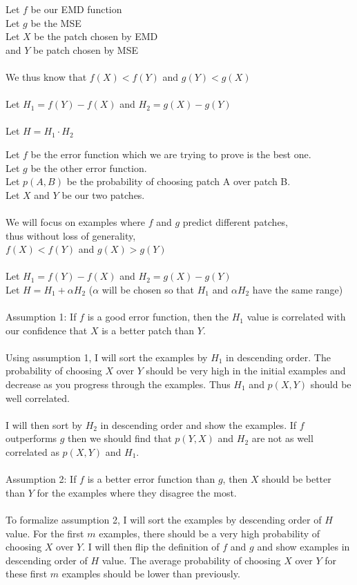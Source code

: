 \documentclass[12pt,psfig]{article}
\begin{document}
\setlength{\parskip}{1.2ex plus0.3ex minus 0.3ex}


\thispagestyle{empty} \pagestyle{myheadings} 

Let $f$ be our EMD function\\
Let $g$ be the MSE\\
Let $X$ be the patch chosen by EMD \\
and $Y$ be patch chosen by MSE\\
\\
We thus know that $f(X)<f(Y)$ and $g(Y)<g(X)$\\
\\
Let $H_1=f(Y)-f(X)$ and $H_2=g(X)-g(Y)$\\
\\
Let $H=H_1 \cdot H_2$

\newpage

Let $f$ be the error function which we are trying to prove is the best one.\\
Let $g$ be the other error function.\\
Let $p(A,B)$ be the probability of choosing patch A over patch B.\\
Let $X$ and $Y$ be our two patches.\\
\\
We will focus on examples where $f$ and $g$ predict different patches, \\
thus without loss of generality,\\
$f(X) < f(Y)$ and $g(X) > g(Y)$\\
\\
Let $H_1 = f(Y)-f(X)$ and $H_2 = g(X)-g(Y)$\\
Let $H = H_1 + \alpha H_2$ ($\alpha$ will be chosen so that $H_1$ and $\alpha H_2$ have the same range)\\
\\
Assumption 1: If $f$ is a good error function, then the $H_1$ value is correlated with our confidence that $X$ is a better patch than $Y$.\\
\\
Using assumption 1, I will sort the examples by $H_1$ in descending order. The probability of choosing $X$ over $Y$ should be very high in the initial examples and decrease as you progress through the examples. Thus $H_1$ and $p(X,Y)$ should be well correlated.\\
\\
I will then sort by $H_2$ in descending order and show the examples. If $f$ outperforms $g$ then we should find that $p(Y,X)$ and $H_2$ are not as well correlated as $p(X,Y)$ and $H_1$.  \\
\\
Assumption 2: If $f$ is a better error function than $g$, then $X$ should be better than $Y$ for the examples where they disagree the most.\\
\\
To formalize assumption 2, I will sort the examples by descending order of $H$ value. For the first $m$ examples, there should be a very high probability of choosing $X$ over $Y$. I will then flip the definition of $f$ and $g$ and show examples in descending order of $H$ value. The average probability of choosing $X$ over $Y$ for these first $m$ examples should be lower than previously.
\end{document}
